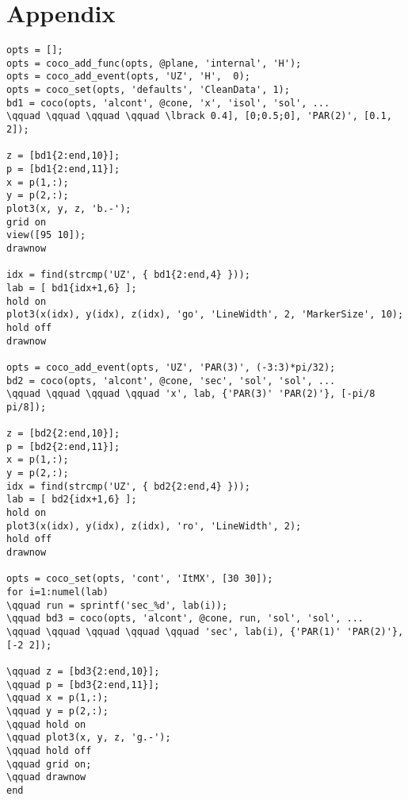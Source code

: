 \documentclass{article}
\begin{document}
\section{Appendix}
\begin{verbatim}
opts = [];
opts = coco_add_func(opts, @plane, 'internal', 'H');
opts = coco_add_event(opts, 'UZ', 'H',  0);
opts = coco_set(opts, 'defaults', 'CleanData', 1);
bd1 = coco(opts, 'alcont', @cone, 'x', 'isol', 'sol', ...
\qquad \qquad \qquad \qquad \lbrack 0.4], [0;0.5;0], 'PAR(2)', [0.1, 2]);
 
z = [bd1{2:end,10}];
p = [bd1{2:end,11}];
x = p(1,:);
y = p(2,:);
plot3(x, y, z, 'b.-');
grid on
view([95 10]);
drawnow
 
idx = find(strcmp('UZ', { bd1{2:end,4} }));
lab = [ bd1{idx+1,6} ];
hold on
plot3(x(idx), y(idx), z(idx), 'go', 'LineWidth', 2, 'MarkerSize', 10);
hold off
drawnow
 
opts = coco_add_event(opts, 'UZ', 'PAR(3)', (-3:3)*pi/32);
bd2 = coco(opts, 'alcont', @cone, 'sec', 'sol', 'sol', ...
\qquad \qquad \qquad \qquad 'x', lab, {'PAR(3)' 'PAR(2)'}, [-pi/8 pi/8]);
 
z = [bd2{2:end,10}];
p = [bd2{2:end,11}];
x = p(1,:);
y = p(2,:);
idx = find(strcmp('UZ', { bd2{2:end,4} }));
lab = [ bd2{idx+1,6} ];
hold on
plot3(x(idx), y(idx), z(idx), 'ro', 'LineWidth', 2);
hold off
drawnow
 
opts = coco_set(opts, 'cont', 'ItMX', [30 30]);
for i=1:numel(lab)
\qquad run = sprintf('sec_%d', lab(i));
\qquad bd3 = coco(opts, 'alcont', @cone, run, 'sol', 'sol', ...
\qquad \qquad \qquad \qquad \qquad 'sec', lab(i), {'PAR(1)' 'PAR(2)'}, [-2 2]);
 
\qquad z = [bd3{2:end,10}];
\qquad p = [bd3{2:end,11}];
\qquad x = p(1,:);
\qquad y = p(2,:);
\qquad hold on
\qquad plot3(x, y, z, 'g.-');
\qquad hold off
\qquad grid on;
\qquad drawnow
end
\end{verbatim}
\end{document}
